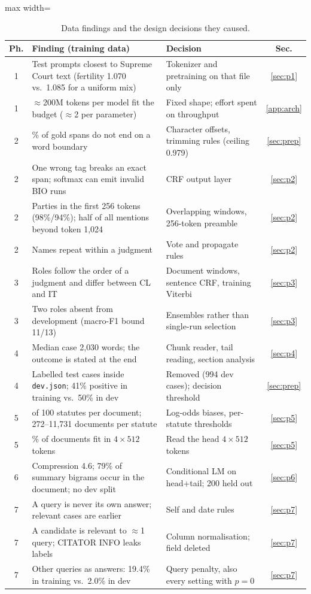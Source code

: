 \documentclass[11pt, oneside]{article}
\begin{document}
\begin{table}[htbp]
\centering\scriptsize
\caption{Data findings and the design decisions they caused.}
\label{tab:links}
\begin{adjustbox}{max width=\textwidth}
\begin{tabular}{c>{\raggedright\arraybackslash}p{8.4cm}>{\raggedright\arraybackslash}p{6.2cm}c}
\toprule
Ph. & Finding (training data) & Decision & Sec.\\
\midrule
1 & Test prompts closest to Supreme Court text (fertility 1.070 vs.\ 1.085 for a uniform mix) & Tokenizer and pretraining on that file only & \ref{sec:p1}\\
1 & $\approx$200M tokens per model fit the budget ($\approx$2 per parameter) & Fixed shape; effort spent on throughput & \ref{app:arch}\\
2 & 40\% of gold spans do not end on a word boundary & Character offsets, trimming rules (ceiling 0.979) & \ref{sec:prep}\\
2 & One wrong tag breaks an exact span; softmax can emit invalid BIO runs & CRF output layer & \ref{sec:p2}\\
2 & Parties in the first 256 tokens (98\%/94\%); half of all mentions beyond token 1{,}024 & Overlapping windows, 256-token preamble & \ref{sec:p2}\\
2 & Names repeat within a judgment & Vote and propagate rules & \ref{sec:p2}\\
3 & Roles follow the order of a judgment and differ between CL and IT & Document windows, sentence CRF, training Viterbi & \ref{sec:p3}\\
3 & Two roles absent from development (macro-F1 bound 11/13) & Ensembles rather than single-run selection & \ref{sec:p3}\\
4 & Median case 2{,}030 words; the outcome is stated at the end & Chunk reader, tail reading, section analysis & \ref{sec:p4}\\
4 & Labelled test cases inside \texttt{dev.json}; 41\% positive in training vs.\ 50\% in dev & Removed (994 dev cases); decision threshold & \ref{sec:prep}\\
5 & 3.7 of 100 statutes per document; 272--11{,}731 documents per statute & Log-odds biases, per-statute thresholds & \ref{sec:p5}\\
5 & 78\% of documents fit in $4\times512$ tokens & Read the head $4\times512$ tokens & \ref{sec:p5}\\
6 & Compression 4.6; 79\% of summary bigrams occur in the document; no dev split & Conditional LM on head+tail; 200 held out & \ref{sec:p6}\\
7 & A query is never its own answer; relevant cases are earlier & Self and date rules & \ref{sec:p7}\\
7 & A candidate is relevant to $\approx$1 query; CITATOR INFO leaks labels & Column normalisation; field deleted & \ref{sec:p7}\\
7 & Other queries as answers: 19.4\% in training vs.\ 2.0\% in dev & Query penalty, also every setting with $p{=}0$ & \ref{sec:p7}\\
\bottomrule
\end{tabular}
\end{adjustbox}
\end{table}
\end{document}
